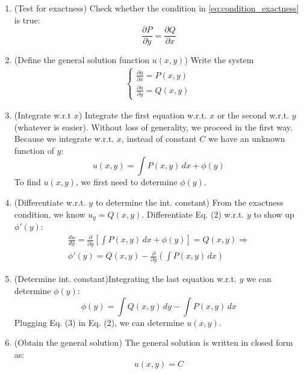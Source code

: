 \documentclass[a4paper]{article}
\begin{document}
\begin{enumerate}
    \item (Test for exactness) Check whether the condition in \eqref{eq:condition_exactness}  is true:
        \[
            \frac{\partial P}{\partial y}   = \frac{\partial Q}{\partial x} 
        \]
    \item (Define the general solution function $u(x,y)$) Write the system
    \begin{gather*}
        \left\{
        \begin{array}{ll}
            \frac{\partial u}{\partial x}  = P(x,y) \\
            \frac{\partial u}{\partial y}  = Q(x,y)
        \end{array} 
        \right. 
    \end{gather*}
    
    \item {}(Integrate w.r.t $x$) Integrate the first equation w.r.t. $x$ or the second w.r.t. $y$ (whatever is easier). Without loss of generality, we proceed in the first way. Because we integrate w.r.t. $x$, instead of constant $C$ we have an unknown function of $y$:
        \[
            u(x,y) = \int P(x,y)\, dx + \phi(y)
            \tag{2}
        \]
        To find $u(x,y)$, we first need to determine $\phi(y)$.

    \item (Differentiate w.r.t. $y$ to determine the int. constant) From the exactness condition, we know $u_y = Q(x,y)$. Differentiate Eq. (2) w.r.t. $y$ to show up $\phi'(y)$:
        \begin{gather*}
            \frac{du}{dy} = \frac{\partial}{\partial y} \left[\int P(x,y)\, dx + \phi(y) \right] = Q(x,y) \Rightarrow \\
            \phi'(y) = Q(x,y) - \frac{\partial}{\partial y} \left(\int P(x,y)\, dx \right)
        \end{gather*}

    \item {}(Determine int. constant)Integrating the last equation w.r.t. $y$ we can determine $\phi(y)$:
        \[
            \phi(y) = \int Q(x,y)\, dy - \int P(x,y) \, dx
            \tag{3}
        \]
        Plugging Eq. (3) in Eq. (2), we can determine $u(x,y)$.

    \item (Obtain the general solution) The general solution is written in closed form as:
        \[
            u(x,y) = C
        \]
\end{enumerate}
\end{document}
